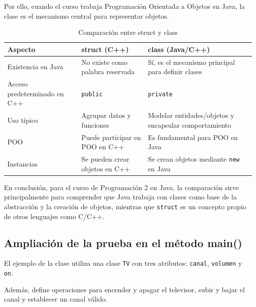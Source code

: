 \documentclass[12pt,a4paper]{article}
\begin{document}
Por ello, cuando el curso trabaja Programación Orientada a Objetos
en Java, la clase es el mecanismo central para representar objetos.

\begin{table}[H]
\centering
\caption{Comparación entre struct y class}
\renewcommand{\arraystretch}{1.3}

\begin{tabular}{p{3.5cm} p{4.5cm} p{5cm}}
\toprule
\textbf{Aspecto} &
\textbf{struct (C++)} &
\textbf{class (Java/C++)} \\
\midrule

Existencia en Java &
No existe como palabra reservada &
Sí, es el mecanismo principal para definir clases \\

Acceso predeterminado en C++ &
\texttt{public} &
\texttt{private} \\

Uso típico &
Agrupar datos y funciones &
Modelar entidades/objetos y encapsular comportamiento \\

POO &
Puede participar en POO en C++ &
Es fundamental para POO en Java \\

Instancias &
Se pueden crear objetos en C++ &
Se crean objetos mediante \texttt{new} en Java \\

\bottomrule
\end{tabular}

\end{table}

En conclusión, para el curso de Programación 2 en Java, la
comparación sirve principalmente para comprender que Java trabaja
con clases como base de la abstracción y la creación de objetos,
mientras que \texttt{struct} es un concepto propio de otros
lenguajes como C/C++.


\subsection{Ampliación de la prueba en el método main()}

El ejemplo de la clase utiliza una clase \texttt{TV} con tres
atributos: \texttt{canal}, \texttt{volumen} y \texttt{on}.

Además, define operaciones para encender y apagar el televisor,
subir y bajar el canal y establecer un canal válido.
\end{document}
